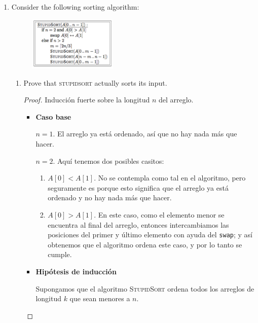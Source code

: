 \documentclass[letterpaper,11pt]{article}
\begin{document}
\begin{enumerate}
    \item Consider the following sorting algorithm:
    \begin{figure}[ht]
        \centering
        \includegraphics[width=0.4\textwidth]{./imagenes/stupidSort.png}
    \end{figure}

    \begin{enumerate}
        \item Prove that \textsc{stupidsort} actually sorts its input.
        \begin{proof}
            Inducción fuerte sobre la longitud $n$ del arreglo. 
            \begin{itemize}
                \item \textbf{Caso base}
                
                $n = 1$. El arreglo ya está ordenado, así que no hay nada más 
                que hacer. 

                $n = 2$. Aquí tenemos dos posibles casitos:
                \begin{enumerate}
                    \item $A[0] < A[1]$. No se contempla como tal en el
                    algoritmo, pero seguramente es porque esto significa que 
                    el arreglo ya está ordenado y no hay nada más que hacer.

                    \item $A[0] > A[1]$. En este  caso, como el elemento menor 
                    se encuentra al final del arreglo, entonces intercambiamos 
                    las posiciones del primer y último elemento con ayuda del 
                    \texttt{swap}; y así obtenemos que el algoritmo ordena 
                    este caso, y por lo tanto se cumple. 
                \end{enumerate}

                \item \textbf{Hipótesis de inducción}

                Supongamos que el algoritmo \textsc{StupidSort} ordena todos 
                los arreglos de longitud $k$ que sean menores a $n$. 


\end{itemize}
\end{proof}
\end{enumerate}
\end{enumerate}
\end{document}
